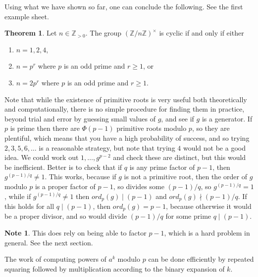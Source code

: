\documentclass{article}
\newcommand{\Z}{\mathbb{Z}}
\newcommand{\rb}[1]{\left( #1 \right)}
\newcommand{\unit}[1]{\rb{\Z / #1\Z}^\times}
\theoremstyle{definition}\newtheorem{definition}{Definition}
\theoremstyle{definition}\newtheorem*{remark}{Remark}
\theoremstyle{definition}\newtheorem*{example}{Example}
\theoremstyle{definition}\newtheorem*{note}{Note}
\newtheorem{theorem}[definition]{Theorem}
\begin{document}
Using what we have shown so far, one can conclude the following. See the first example sheet.

\begin{theorem}
Let $ n \in \Z_{> 0} $. The group $ \unit{n} $ is cyclic if and only if either
\begin{enumerate}
\item $ n = 1, 2, 4 $,
\item $ n = p^r $ where $ p $ is an odd prime and $ r \ge 1 $, or
\item $ n = 2p^r $ where $ p $ is an odd prime and $ r \ge 1 $.
\end{enumerate}
\end{theorem}


Note that while the existence of primitive roots is very useful both theoretically and computationally, there is no simple procedure for finding them in practice, beyond trial and error by guessing small values of $ g $, and see if $ g $ is a generator. If $ p $ is prime then there are $ \Phi\rb{p - 1} $ primitive roots modulo $ p $, so they are plentiful, which means that you have a high probability of success, and so trying $ 2, 3, 5, 6, \dots $ is a reasonable strategy, but note that trying $ 4 $ would not be a good idea. We could work out $ 1, \dots, g^{p - 2} $ and check these are distinct, but this would be inefficient. Better is to check that if $ q $ is any prime factor of $ p - 1 $, then $ g^{\rb{p - 1} / q} \ne 1 $. This works, because if $ g $ is not a primitive root, then the order of $ g $ modulo $ p $ is a proper factor of $ p - 1 $, so divides some $ \rb{p - 1} / q $, so $ g^{\rb{p - 1} / q} = 1 $, while if $ g^{\rb{p - 1} / q} \ne 1 $ then $ ord_p\rb{g} \mid \rb{p - 1} $ and $ ord_p\rb{g} \nmid \rb{p - 1} / q $. If this holds for all $ q \mid \rb{p - 1} $, then $ ord_p\rb{g} = p - 1 $, because otherwise it would be a proper divisor, and so would divide $ \rb{p - 1} / q $ for some prime $ q \mid \rb{p - 1} $.

\begin{note}
This does rely on being able to factor $ p - 1 $, which is a hard problem in general. See the next section.
\end{note}

The work of computing powers of $ a^k $ modulo $ p $ can be done efficiently by repeated squaring followed by multiplication according to the binary expansion of $ k $.
\end{document}
